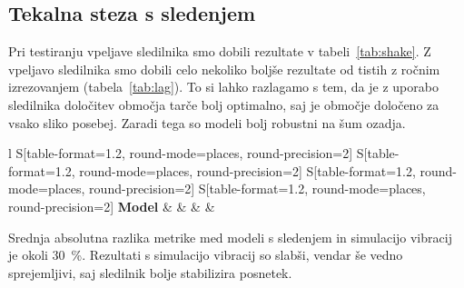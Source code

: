 \subsection{Tekalna steza s sledenjem}
Pri testiranju vpeljave sledilnika smo dobili rezultate v tabeli~\ref{tab:shake}. Z vpeljavo sledilnika smo dobili celo nekoliko boljše rezultate od tistih z ročnim izrezovanjem (tabela~\ref{tab:lag}). To si lahko razlagamo s tem, da je z uporabo sledilnika določitev območja tarče bolj optimalno, saj je območje določeno za vsako sliko posebej. Zaradi tega so modeli bolj robustni na šum ozadja.




\begin{table}[!htbp]
	\centering
	\begin{tabular}{l S[table-format=1.2, round-mode=places, round-precision=2] S[table-format=1.2, round-mode=places, round-precision=2] S[table-format=1.2, round-mode=places, round-precision=2] S[table-format=1.2, round-mode=places, round-precision=2]}
		\toprule
		\textbf{Model} & \thead{\corr} & \thead{\rae} & \thead{\rrse} & \thead{\nsv}\\
		\midrule
		\bottomrule
	\end{tabular}
	\caption[Rezultati tekalne steze s sledenjem]{Rezultati tekalne steze s sledenjem. Pri modelih s \textit{sh} kratico smo uporabili simulacijo vibracij. Modeli \textit{tr} so brez vibracij.}
	\label{tab:shake}
\end{table}


Srednja absolutna razlika \rrse metrike med modeli s sledenjem in simulacijo vibracij je okoli \SI{30}{\%}. Rezultati s simulacijo vibracij so slabši, vendar še vedno sprejemljivi, saj sledilnik bolje stabilizira posnetek.











